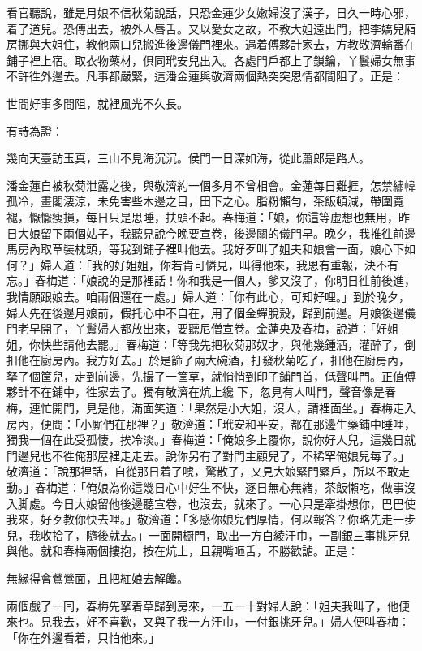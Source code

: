 看官聽說，雖是月娘不信秋菊說話，只恐金蓮少女嫩婦沒了漢子，日久一時心邪，着了道兒。恐傳出去，被外人唇舌。又以愛女之故，不教大姐遠出門，把李嬌兒廂房挪與大姐住，教他兩口兒搬進後邊儀門裡來。遇着傅夥計家去，方教敬濟輪番在鋪子裡上宿。取衣物藥材，俱同玳安兒出入。各處門戶都上了鎖鑰，丫鬟婦女無事不許徃外邊去。凡事都嚴緊，這潘金蓮與敬濟兩個熱突突恩情都間阻了。正是：

世間好事多間阻，就裡風光不久長。

有詩為證：

幾向天臺訪玉真，三山不見海沉沉。侯門一日深如海，從此蕭郎是路人。

潘金蓮自被秋菊泄露之後，與敬濟約一個多月不曾相會。金蓮每日難捱，怎禁繡幃孤冷，畫閣淒涼，未免害些木邊之目，田下之心。脂粉懶勻，茶飯頓減，帶圍寬褪，懨懨瘦損，每日只是思睡，扶頭不起。春梅道：「娘，你這等虛想也無用，昨日大娘留下兩個姑子，我聽見說今晚要宣卷，後邊關的儀門早。晚夕，我推徃前邊馬房內取草裝枕頭，等我到鋪子裡叫他去。我好歹叫了姐夫和娘會一面，娘心下如何？」婦人道：「我的好姐姐，你若肯可憐見，叫得他來，我恩有重報，決不有忘。」{}春梅道：「娘說的是那裡話！你和我是一個人，爹又沒了，你明日徃前後進，我情願跟娘去。咱兩個還在一處。」婦人道：「你有此心，可知好哩。」到於晚夕，婦人先在後邊月娘前，假托心中不自在，用了個金蟬脫殼，歸到前邊。月娘後邊儀門老早開了，丫鬟婦人都放出來，要聽尼僧宣卷。金蓮央及春梅，說道：「好姐姐，你快些請他去罷。」春梅道：「等我先把秋菊那奴才，與他幾鍾酒，灌醉了，倒扣他在廚房內。我方好去。」於是篩了兩大碗酒，打發秋菊吃了，扣他在廚房內，拏了個筐兒，走到前邊，先撮了一筐草，就悄悄到印子鋪門首，低聲叫門。正值傅夥計不在鋪中，徃家去了。獨有敬濟在炕上纔𢱉下，忽見有人叫門，聲音像是春梅，連忙開門，見是他，滿面笑道：「果然是小大姐，沒人，請裡面坐。」春梅走入房內，便問：「小厮們在那裡？」{}敬濟道：「玳安和平安，都在那邊生藥鋪中睡哩，獨我一個在此受孤悽，挨冷淡。」春梅道：「俺娘多上覆你，說你好人兒，這幾日就門邊兒也不徃俺那屋裡走走去。說你另有了對門主顧兒了，不稀罕俺娘兒每了。」敬濟道：「說那裡話，自從那日着了唬，驚散了，又見大娘緊門緊戶，所以不敢走動。」春梅道：「俺娘為你這幾日心中好生不快，逐日無心無緒，茶飯懶吃，做事沒入脚處。今日大娘留他後邊聽宣卷，也沒去，就來了。一心只是牽掛想你，巴巴使我來，好歹教你快去哩。」敬濟道：「多感你娘兒們厚情，何以報答？你略先走一步兒，我收拾了，隨後就去。」一面開橱門，取出一方白綾汗巾，一副銀三事挑牙兒與他。就和春梅兩個摟抱，按在炕上，且親嘴咂舌，不勝歡謔。正是：

無緣得會鶯鶯面，且把紅娘去解饞。

兩個戲了一囘，春梅先拏着草歸到房來，一五一十對婦人說：「姐夫我叫了，他便來也。見我去，好不喜歡，又與了我一方汗巾，一付銀挑牙兒。」婦人便叫春梅：「你在外邊看着，只怕他來。」

